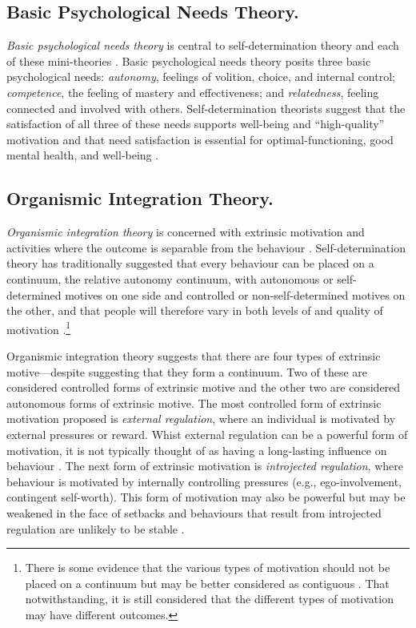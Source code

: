 \documentclass[
  12pt,
  a4paper,
]{book}
\begin{document}
\hypertarget{basic-psychological-needs-theory.}{%
\subsection{Basic Psychological Needs Theory.}\label{basic-psychological-needs-theory.}}

\emph{Basic psychological needs theory} is central to self-determination theory and each of these mini-theories \citep{Ryan2002}. Basic psychological needs theory posits three basic psychological needs: \emph{autonomy}, feelings of volition, choice, and internal control; \emph{competence}, the feeling of mastery and effectiveness; and \emph{relatedness}, feeling connected and involved with others. Self-determination theorists suggest that the satisfaction of all three of these needs supports well-being and ``high-quality'' motivation \citep{Ryan2019} and that need satisfaction is essential for optimal-functioning, good mental health, and well-being \citep{Chen2015, Deci2000}.

\hypertarget{organismic-integration-theory.}{%
\subsection{Organismic Integration Theory.}\label{organismic-integration-theory.}}

\emph{Organismic integration theory} is concerned with extrinsic motivation and activities where the outcome is separable from the behaviour \citep{Ryan1985}. Self-determination theory has traditionally suggested that every behaviour can be placed on a continuum, the relative autonomy continuum, with autonomous or self-determined motives on one side and controlled or non-self-determined motives on the other, and that people will therefore vary in both levels of and quality of motivation \citep{Deci1985b, Sheldon2019}.\footnote{There is some evidence that the various types of motivation should not be placed on a continuum but may be better considered as contiguous \citep{Chemolli2014}. That notwithstanding, it is still considered that the different types of motivation may have different outcomes.}

Organismic integration theory suggests that there are four types of extrinsic motive---despite suggesting that they form a continuum. Two of these are considered controlled forms of extrinsic motive and the other two are considered autonomous forms of extrinsic motive. The most controlled form of extrinsic motivation proposed is \emph{external regulation}, where an individual is motivated by external pressures or reward. Whist external regulation can be a powerful form of motivation, it is not typically thought of as having a long-lasting influence on behaviour \citep{Ryan2000c}. The next form of extrinsic motivation is \emph{introjected regulation}, where behaviour is motivated by internally controlling pressures (e.g., ego-involvement, contingent self-worth). This form of motivation may also be powerful but may be weakened in the face of setbacks and behaviours that result from introjected regulation are unlikely to be stable \citep{Deci1995, Ryan2019}.
\end{document}
